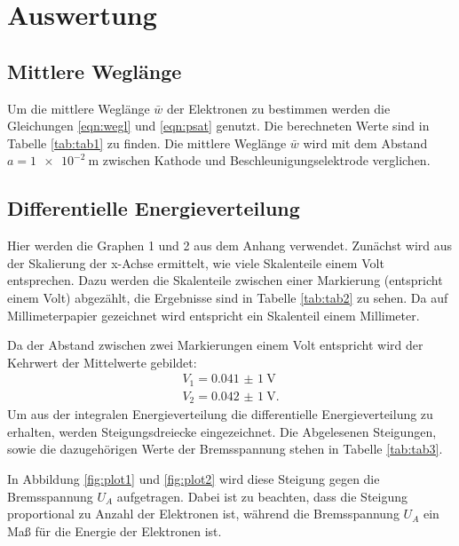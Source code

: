 \section{Auswertung}
\label{sec:Auswertung}
\subsection{Mittlere Weglänge}

Um die mittlere Weglänge $\bar{w}$ der Elektronen zu bestimmen werden die Gleichungen
\ref{eqn:wegl} und \ref{eqn:psat} genutzt. Die berechneten Werte sind in Tabelle
\ref{tab:tab1} zu finden. Die mittlere Weglänge $\bar{w}$ wird mit dem Abstand
$a=\SI{1e-2}{\m}$ zwischen
Kathode und Beschleunigungselektrode verglichen.



\subsection{Differentielle Energieverteilung}
Hier werden die Graphen 1 und 2 aus dem Anhang verwendet.
Zunächst wird aus der Skalierung der x-Achse ermittelt, wie viele
Skalenteile einem Volt entsprechen. Dazu werden die Skalenteile zwischen einer
Markierung (entspricht einem Volt) abgezählt, die Ergebnisse sind in
Tabelle \ref{tab:tab2} zu sehen. Da auf Millimeterpapier gezeichnet wird entspricht
ein Skalenteil einem Millimeter.


Da der Abstand zwischen zwei Markierungen einem Volt entspricht wird der
Kehrwert der Mittelwerte gebildet:
\begin{align*}
  V_1=\SI{0,041(1)}{\V}\\
  V_2=\SI{0,042(1)}{\V}.
\end{align*}
Um aus der integralen
Energieverteilung die differentielle Energieverteilung zu erhalten, werden
Steigungsdreiecke eingezeichnet. Die Abgelesenen Steigungen, sowie
die dazugehörigen Werte der Bremsspannung stehen in Tabelle \ref{tab:tab3}.



In Abbildung \ref{fig:plot1} und \ref{fig:plot2} wird
diese Steigung gegen die Bremsspannung $U_A$ aufgetragen. Dabei ist zu beachten, dass
die Steigung proportional zu Anzahl der Elektronen ist, während die Bremsspannung $U_A$
ein Maß für die Energie der Elektronen ist.



